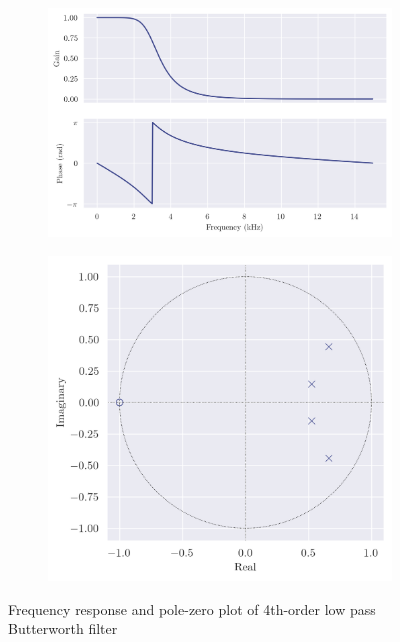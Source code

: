 \begin{figure}[!ht]
    \centering
    \begin{subfigure}[b]{0.58\textwidth}
        \centering
        \includegraphics[width=\textwidth]{images/q7_4th_freqz.png}
    \end{subfigure}
    \hfill
    \begin{subfigure}[b]{0.41\textwidth}
        \centering
        \includegraphics[width=\textwidth]{images/q7_4th_zp.png}
    \end{subfigure}
    \caption{Frequency response and pole-zero plot of 4th-order low pass Butterworth filter}
    \label{fig:q7_4th_freqz_zp}
\end{figure}

